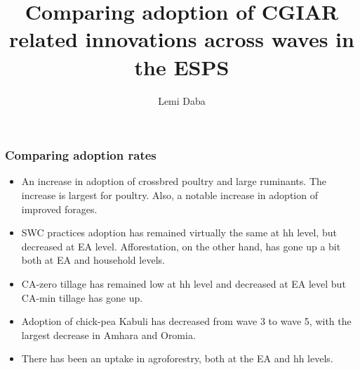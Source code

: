 \documentclass[11pt]{beamer}
\begin{document}
\author{Lemi Daba}
\title{Comparing adoption of CGIAR related innovations across waves in the ESPS}
\begin{frame}[plain]
	\maketitle
\end{frame}

\begin{frame}
\label{frstpg}
\frametitle{Comparing adoption rates}
\begin{itemize}
\item An increase in adoption of crossbred poultry and large ruminants. The increase is largest for poultry. Also, a notable increase in adoption of improved forages.\hyperlink{animaldynplt}{}

\item SWC practices adoption has remained virtually the same at hh level, but decreased at EA level. Afforestation, on the other hand, has gone up a bit both at EA and household levels. \hyperlink{swcaffdynplt}{}

\item CA-zero tillage has remained low at hh level and decreased at EA level but CA-min tillage has gone up. \hyperlink{cadynplt}{}

\item Adoption of chick-pea Kabuli has decreased from wave 3 to wave 5, with the largest decrease in Amhara and Oromia.  \hyperlink{kabulidynplt}{}

\item There has been an uptake in agroforestry, both at the EA and hh levels. \hyperlink{agroforestdynplt}{}

\end{itemize}

\end{frame}
\end{document}
